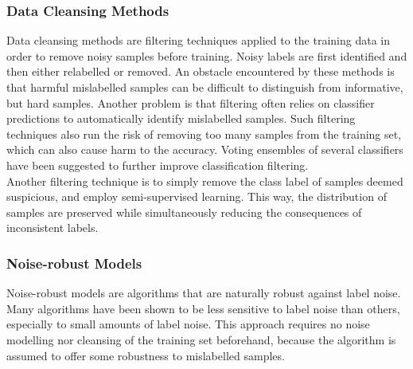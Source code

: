 




\subsubsection{Data Cleansing Methods}

Data cleansing methods are filtering techniques applied to the training data in order to remove noisy samples before training. Noisy labels are first identified and then either relabelled or removed. An obstacle encountered by these methods is that harmful mislabelled samples can be difficult to distinguish from informative, but hard samples. Another problem is that filtering often relies on classifier predictions to automatically identify mislabelled samples. Such filtering techniques also run the risk of removing too many samples from the training set, which can also cause harm to the accuracy. Voting ensembles of several classifiers have been suggested to further improve classification filtering.\\ 

Another filtering technique is to simply remove the class label of samples deemed suspicious, and employ semi-supervised learning. This way, the distribution of samples are preserved while simultaneously reducing the consequences of inconsistent labels.\\


\subsubsection{Noise-robust Models}
Noise-robust models are algorithms that are naturally robust against label noise. Many algorithms have been shown to be less sensitive to label noise than others, especially to small amounts of label noise. This approach requires no noise modelling nor cleansing of the training set beforehand, because the algorithm is assumed to offer some robustness to mislabelled samples.\\

